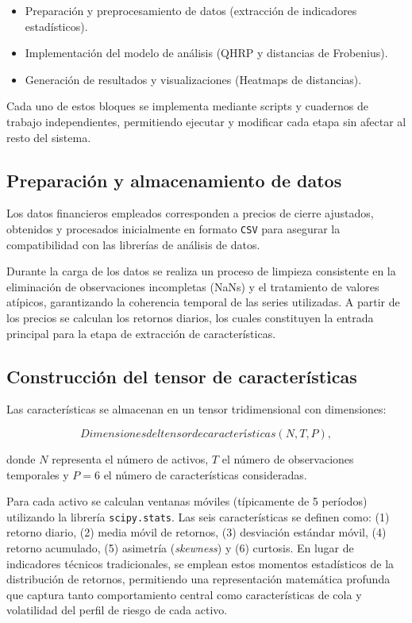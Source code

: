 \begin{itemize}
\item Preparación y preprocesamiento de datos (extracción de indicadores estadísticos).
\item Implementación del modelo de análisis (\gls{QHRP} y distancias de Frobenius).
\item Generación de resultados y visualizaciones (Heatmaps de distancias).
\end{itemize}

Cada uno de estos bloques se implementa mediante scripts y cuadernos de trabajo independientes, permitiendo ejecutar y modificar cada etapa sin afectar al resto del sistema.

\subsection{Preparación y almacenamiento de datos}
\label{sec:preparacion_almacenamiento}
Los datos financieros empleados corresponden a precios de cierre ajustados, obtenidos y procesados inicialmente en formato \texttt{CSV} para asegurar la compatibilidad con las librerías de análisis de datos. 

Durante la carga de los datos se realiza un proceso de limpieza consistente en la eliminación de observaciones incompletas (NaNs) y el tratamiento de valores atípicos, garantizando la coherencia temporal de las series utilizadas. A partir de los precios se calculan los retornos diarios, los cuales constituyen la entrada principal para la etapa de extracción de características.

\subsection{Construcción del tensor de características}
\label{sec:construccion_tensor}

Las características se almacenan en un tensor tridimensional con dimensiones:

\begin{equation}[eq:dimensiones_tensor]{Dimensiones del tensor de características}
(N, T, P),
\end{equation}

donde $N$ representa el número de activos, $T$ el número de observaciones temporales y $P=6$ el número de características consideradas. 

Para cada activo se calculan ventanas móviles (típicamente de 5 períodos) utilizando la librería \texttt{scipy.stats}. Las seis características se definen como: (1) retorno diario, (2) media móvil de retornos, (3) desviación estándar móvil, (4) retorno acumulado, (5) asimetría (\textit{skewness}) y (6) curtosis. En lugar de indicadores técnicos tradicionales, se emplean estos momentos estadísticos de la distribución de retornos, permitiendo una representación matemática profunda que captura tanto comportamiento central como características de cola y volatilidad del perfil de riesgo de cada activo.

